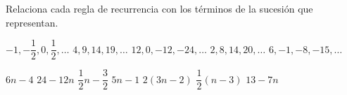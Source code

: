 Relaciona cada regla de recurrencia con los términos de la sucesión que representan.

\begin{multicols}{2}
    \begin{choices}
        \choice $-1, -\dfrac{1}{2}, 0, \dfrac{1}{2},\dots $
        \choice $4, 9, 14, 19, \dots$
        \choice $12, 0, -12, -24, \dots$
        \choice $2, 8, 14, 20, \dots$
        \choice $6, -1, -8, -15, \dots$
    \end{choices}
    \columnbreak
    \begin{parts}
        \fillin[D][1cm] $6n - 4$
        \fillin[C][1cm] $24 - 12n$
        \fillin[A][1cm] $\dfrac{1}{2}n-\dfrac{3}{2}$
        \fillin[B][1cm] $5n-1$
        \fillin[D][1cm] $2\left(3n-2\right)$
        \fillin[A][1cm] $\dfrac{1}{2}\left(n-3\right)$
        \fillin[E][1cm] $13-7n$
    \end{parts}
\end{multicols}